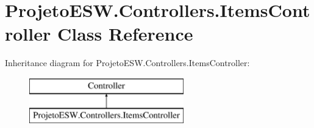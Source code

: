 \hypertarget{class_projeto_e_s_w_1_1_controllers_1_1_items_controller}{}\section{Projeto\+E\+S\+W.\+Controllers.\+Items\+Controller Class Reference}
\label{class_projeto_e_s_w_1_1_controllers_1_1_items_controller}
Inheritance diagram for Projeto\+E\+S\+W.\+Controllers.\+Items\+Controller\+:\begin{figure}[H]
\begin{center}
\leavevmode
\includegraphics[height=2.000000cm]{class_projeto_e_s_w_1_1_controllers_1_1_items_controller}
\end{center}
\end{figure}

